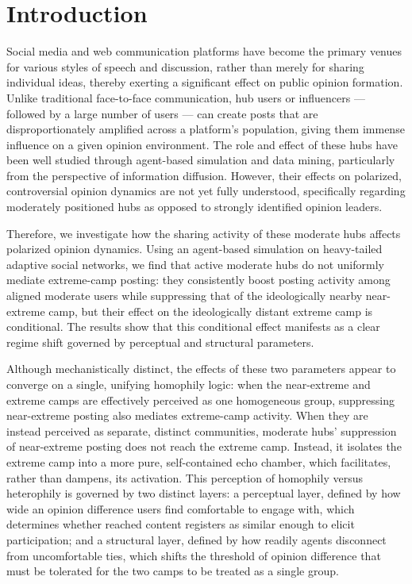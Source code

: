 \documentclass{svproc}
\def\Blue{\color[rgb]{0,0,1}}
\begin{document}
\Blue


\section{Introduction}\label{sec:intro}
Social media and web communication platforms have become the primary
venues for various styles of speech and discussion, rather than merely
for sharing individual ideas, thereby exerting a significant effect on
public opinion formation. Unlike traditional face-to-face
communication, hub users or influencers --- followed by a large number
of users --- can create posts that are disproportionately amplified
across a platform's population, giving them immense influence on a
given opinion environment. The role and effect of these hubs have been
well studied through agent-based simulation and data mining,
particularly from the perspective of information diffusion. However,
their effects on polarized, controversial opinion dynamics are not yet
fully understood, specifically regarding moderately positioned hubs as
opposed to strongly identified opinion leaders.
\par


Therefore, we investigate how the sharing activity of these moderate
hubs affects polarized opinion dynamics. Using an agent-based
simulation on heavy-tailed adaptive social networks, we find that
active moderate hubs do not uniformly mediate extreme-camp posting:
they consistently boost posting activity among aligned moderate users
while suppressing that of the ideologically nearby near-extreme camp,
but their effect on the ideologically distant extreme camp is
conditional. The results show that this conditional effect manifests
as a clear regime shift governed by perceptual and structural
parameters.
\par


Although mechanistically distinct, the effects of these two parameters
appear to converge on a single, unifying homophily logic: when the
near-extreme and extreme camps are effectively perceived as one
homogeneous group, suppressing near-extreme posting also mediates
extreme-camp activity. When they are instead perceived as separate,
distinct communities, moderate hubs' suppression of near-extreme
posting does not reach the extreme camp. Instead, it isolates the
extreme camp into a more pure, self-contained echo chamber, which
facilitates, rather than dampens, its activation. This perception of
homophily versus heterophily is governed by two distinct layers: a
perceptual layer, defined by how wide an opinion difference users find
comfortable to engage with, which determines whether reached content
registers as similar enough to elicit participation; and a structural
layer, defined by how readily agents disconnect from uncomfortable
ties, which shifts the threshold of opinion difference that must be
tolerated for the two camps to be treated as a single group.
\par
\end{document}
